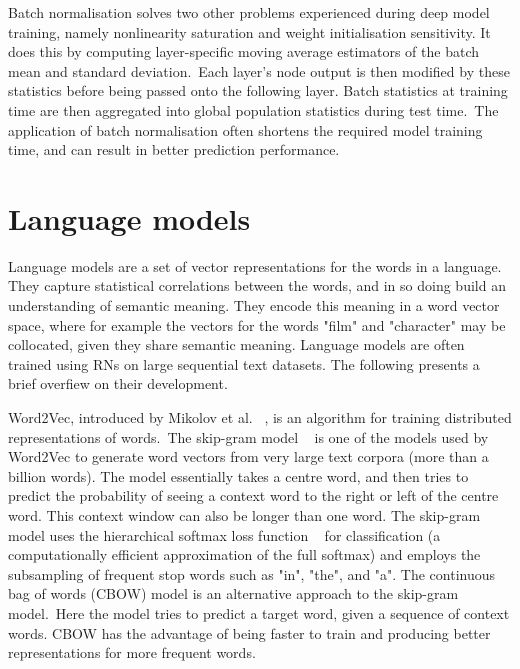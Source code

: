 \noindent Batch normalisation solves two other problems experienced during deep model training, namely nonlinearity saturation and weight initialisation sensitivity. It does this by computing layer-specific moving average estimators of the batch mean and standard deviation.\ Each layer's node output is then modified by these statistics before being passed onto the following layer. Batch statistics at training time are then aggregated into global population statistics during test time.\ The application of batch normalisation often shortens the required model training time, and can result in better prediction performance. 



\section{Language models}

\noindent Language models are a set of vector representations for the words in a language. They capture statistical correlations between the words, and in so doing build an understanding of semantic meaning. They encode this meaning in a word vector space, where for example the vectors for the words "film" and "character" may be collocated, given they share semantic meaning. Language models are often trained using RNs on large sequential text datasets. The following presents a brief overfiew on their development. \par

\noindent Word2Vec, introduced by Mikolov et al. \unskip ~\citep{mikolov2013distributed}, is an algorithm for training distributed representations of words.\ The skip-gram model \unskip ~\citep{mikolov2013efficient} is one of the models used by Word2Vec to generate word vectors from very large text corpora (more than a billion words). The model essentially takes a centre word, and then tries to predict the probability of seeing a context word to the right or left of the centre word. This context window can also be longer than one word. The skip-gram model uses the hierarchical softmax loss function \unskip~\citep{morin2005hierarchical} for classification (a computationally efficient approximation of the full softmax) and employs the subsampling of frequent stop words such as "in", "the", and "a". The continuous bag of words (CBOW) model is an alternative approach to the skip-gram model.\ Here the model tries to predict a target word, given a sequence of context words. CBOW has the advantage of being faster to train and producing better representations for more frequent words. \par

